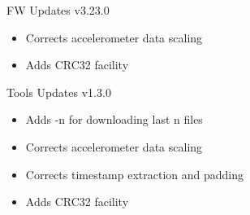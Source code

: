 \begin{frame}{FW Updates}
    v3.23.0
    \begin{itemize}
        \item Corrects accelerometer data scaling
        \item Adds CRC32 facility
    \end{itemize}
\end{frame}

\begin{frame}{Tools Updates}
    v1.3.0
    \begin{itemize}
        \item Adds -n for downloading last n files
        \item Corrects accelerometer data scaling
        \item Corrects timestamp extraction and padding
        \item Adds CRC32 facility
    \end{itemize}
\end{frame}


